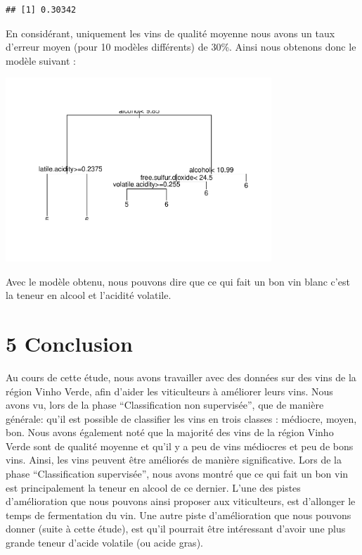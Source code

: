 \documentclass[
]{article}
\begin{document}
\begin{verbatim}
## [1] 0.30342
\end{verbatim}

En considérant, uniquement les vins de qualité moyenne nous avons un
taux d'erreur moyen (pour 10 modèles différents) de 30\%. Ainsi nous
obtenons donc le modèle suivant :

\begin{center}
	\includegraphics[width=10cm]{repport_files/figure-latex/unnamed-chunk-30-1.pdf}
\end{center}

Avec le modèle obtenu, nous pouvons dire que ce qui fait un bon vin
blanc c'est la teneur en alcool et l'acidité volatile.

\hypertarget{conclusion}{%
\section{5 Conclusion}\label{conclusion}}

Au cours de cette étude, nous avons travailler avec des données sur des
vins de la région Vinho Verde, afin d'aider les viticulteurs à améliorer
leurs vins. Nous avons vu, lors de la phase ``Classification non
supervisée'', que de manière générale: qu'il est possible de classifier
les vins en trois classes : médiocre, moyen, bon. Nous avons également
noté que la majorité des vins de la région Vinho Verde sont de qualité
moyenne et qu'il y a peu de vins médiocres et peu de bons vins. Ainsi,
les vins peuvent être améliorés de manière significative. Lors de la
phase ``Classification supervisée'', nous avons montré que ce qui fait
un bon vin est principalement la teneur en alcool de ce dernier. L'une
des pistes d'amélioration que nous pouvons ainsi proposer aux
viticulteurs, est d'allonger le temps de fermentation du vin. Une autre
piste d'amélioration que nous pouvons donner (suite à cette étude), est
qu'il pourrait être intéressant d'avoir une plus grande teneur d'acide
volatile (ou acide gras).
\end{document}
